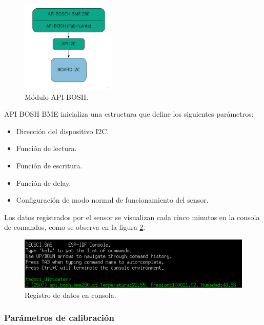 \begin{figure}[h!]
	\centering
	\includegraphics[width=0.4\textwidth]{./Figures/api_bosh_bme.jpg}
	\caption{Módulo API BOSH.}
	\label{fig:api_bosh}
\end{figure}

API BOSH BME inicializa una estructura que define los siguientes parámetros:
\begin{itemize}
\item Dirección del dispositivo I2C.
\item Función de lectura.
\item Función de escritura.
\item Función de delay.
\item Configuración de modo normal de funcionamiento del sensor. 
\end{itemize}

Los datos registrados por el sensor se visualizan cada cinco minutos en la consola de comandos, como se observa en la figura \ref{fig:api_bosh_consola}.

\begin{figure}[h!]
	\centering
	\includegraphics[width=1\textwidth]{./Figures/registro_bme.png}
	\caption{Registro de datos en consola.}
	\label{fig:api_bosh_consola}
\end{figure}

 

\subsubsection{Parámetros de calibración}
\label{subsec:calibracion}

